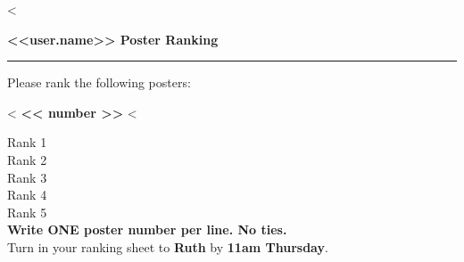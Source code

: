 \documentclass[12pt]{article}
\newlength{\truncated}
\begin{document}
<%

{\Large \bfseries <<user.name>> \hfill Poster Ranking}
\noindent\rule{\textwidth}{1pt}
\vspace{.25in}
Please rank the following posters:

\begin{elaboration}
  \vspace{.10in}%
  {\Large   \hfill}  %
  <%
  {\Large \bfseries << number >> \hfill}
  <%
  \vspace{.10in}%
\end{elaboration}

\vspace{.25in}

\begin{center}
  {\large
    Rank 1 \underline{\hspace{\truncated}} \\
    \vspace{.5in}
    Rank 2 \underline{\hspace{\truncated}} \\
    \vspace{.5in}
    Rank 3 \underline{\hspace{\truncated}} \\
    \vspace{.5in}
    Rank 4 \underline{\hspace{\truncated}} \\
    \vspace{.5in}
    Rank 5 \underline{\hspace{\truncated}} \\
  }
  \vspace{.25in}
  {\bfseries Write ONE poster number per line. No ties.}
  \\
  Turn in your ranking sheet to {\bfseries Ruth} by {\bfseries 11am Thursday}.
\end{center}


\vspace{.25in}
\end{document}
